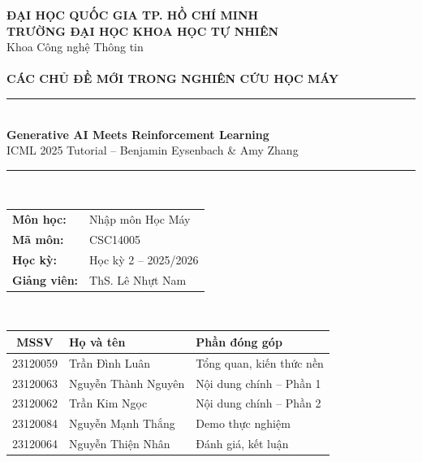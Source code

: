 \documentclass[12pt,a4paper]{article}
\begin{document}
\begin{titlepage}
    \centering
    \vspace*{1.15cm}
    {\Large \textbf{ĐẠI HỌC QUỐC GIA TP. HỒ CHÍ MINH}}\\[0.15cm]
    {\Large \textbf{TRƯỜNG ĐẠI HỌC KHOA HỌC TỰ NHIÊN}}\\[0.25cm]
    {\large Khoa Công nghệ Thông tin}\\[2.0cm]

    {\LARGE \selectfont\bfseries\color{HCMUSBlue}{BÁO CÁO ĐỒ ÁN 3}}\\[0.5cm]
    {\fontsize{15}{20} \textbf{CÁC CHỦ ĐỀ MỚI TRONG NGHIÊN CỨU HỌC MÁY}}\\[0.5cm]
    {\color{HCMUSBlue}\rule{\linewidth}{0.5pt}}\\[0.5cm]
    {\large \textbf{Generative AI Meets Reinforcement Learning}}\\[0.2cm]
    {\normalsize ICML 2025 Tutorial -- Benjamin Eysenbach \& Amy Zhang}\\[0.3cm]
    {\color{HCMUSBlue}\rule{\linewidth}{0.5pt}}\\[2.0cm]

    \begin{tabular}{ll}
        \textbf{Môn học:}    & Nhập môn Học Máy \\
        \textbf{Mã môn:}     & CSC14005 \\
        \textbf{Học kỳ:}     & Học kỳ 2 -- 2025/2026 \\
        \textbf{Giảng viên:} & ThS. Lê Nhựt Nam \\
    \end{tabular}\\[2cm]

    \begin{tabular}{|c|l|l|}
        \hline
        \textbf{MSSV} & \textbf{Họ và tên} & \textbf{Phần đóng góp} \\
        \hline
        23120059 & Trần Đình Luân & Tổng quan, kiến thức nền \\
        \hline
        23120063 & Nguyễn Thành Nguyên & Nội dung chính -- Phần 1 \\
        \hline
        23120062 & Trần Kim Ngọc & Nội dung chính -- Phần 2 \\
        \hline
        23120084 & Nguyễn Mạnh Thắng & Demo thực nghiệm \\
        \hline
        23120064 & Nguyễn Thiện Nhân & Đánh giá, kết luận \\
        \hline
    \end{tabular}\\[2cm]
\end{titlepage}
\end{document}
